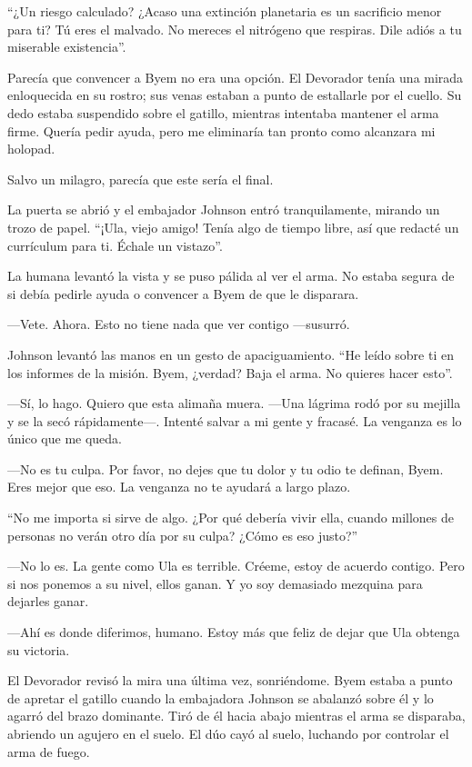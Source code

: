 ``¿Un riesgo calculado? ¿Acaso una extinción planetaria es un sacrificio menor para ti? Tú eres el malvado. No mereces el nitrógeno que respiras. Dile adiós a tu miserable existencia''.

Parecía que convencer a Byem no era una opción. El Devorador tenía una mirada enloquecida en su rostro; sus venas estaban a punto de estallarle por el cuello. Su dedo estaba suspendido sobre el gatillo, mientras intentaba mantener el arma firme. Quería pedir ayuda, pero me eliminaría tan pronto como alcanzara mi holopad.

Salvo un milagro, parecía que este sería el final.

La puerta se abrió y el embajador Johnson entró tranquilamente, mirando un trozo de papel. ``¡Ula, viejo amigo! Tenía algo de tiempo libre, así que redacté un currículum para ti. Échale un vistazo''.

La humana levantó la vista y se puso pálida al ver el arma. No estaba segura de si debía pedirle ayuda o convencer a Byem de que le disparara.

—Vete. Ahora. Esto no tiene nada que ver contigo —susurró.

Johnson levantó las manos en un gesto de apaciguamiento. ``He leído sobre ti en los informes de la misión. Byem, ¿verdad? Baja el arma. No quieres hacer esto''.

—Sí, lo hago. Quiero que esta alimaña muera. —Una lágrima rodó por su mejilla y se la secó rápidamente—. Intenté salvar a mi gente y fracasé. La venganza es lo único que me queda.

—No es tu culpa. Por favor, no dejes que tu dolor y tu odio te definan, Byem. Eres mejor que eso. La venganza no te ayudará a largo plazo.

``No me importa si sirve de algo. ¿Por qué debería vivir ella, cuando millones de personas no verán otro día por su culpa? ¿Cómo es eso justo?''


—No lo es. La gente como Ula es terrible. Créeme, estoy de acuerdo contigo. Pero si nos ponemos a su nivel, ellos ganan. Y yo soy demasiado mezquina para dejarles ganar.

—Ahí es donde diferimos, humano. Estoy más que feliz de dejar que Ula obtenga su victoria.

El Devorador revisó la mira una última vez, sonriéndome. Byem estaba a punto de apretar el gatillo cuando la embajadora Johnson se abalanzó sobre él y lo agarró del brazo dominante. Tiró de él hacia abajo mientras el arma se disparaba, abriendo un agujero en el suelo. El dúo cayó al suelo, luchando por controlar el arma de fuego.

